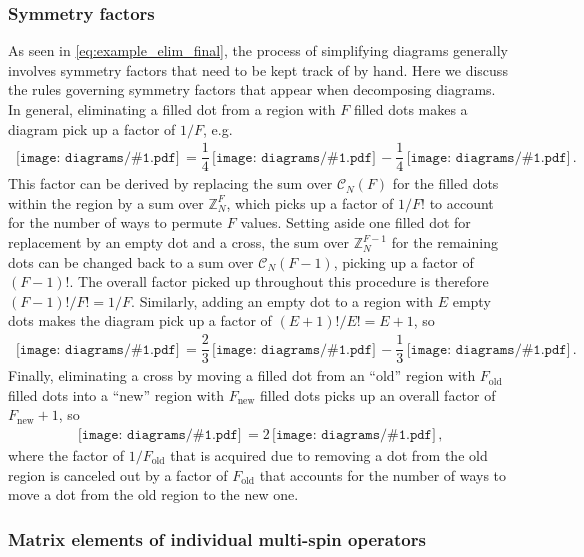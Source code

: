 \documentclass[nofootinbib,notitlepage,11pt]{revtex4-2}
\renewcommand{\t}{\text} %
\newcommand{\f}[2]{\dfrac{#1}{#2}} %
\newcommand{\p}[1]{\left(#1\right)} %
\newcommand{\1}{\mathds{1}}
\newcommand{\C}{\mathcal{C}}
\newcommand{\ZZ}{\mathbb{Z}}
\newcommand{\diagram}[1]
{\,\texttt{[image: diagrams/\#1.pdf]}\,}
\begin{document}
\subsubsection{Symmetry factors}

As seen in \eqref{eq:example_elim_final}, the process of simplifying
diagrams generally involves symmetry factors that need to be kept
track of by hand.  Here we discuss the rules governing symmetry
factors that appear when decomposing diagrams.  In general,
eliminating a filled dot from a region with $F$ filled dots makes a
diagram pick up a factor of $1/F$, e.g.
\begin{align}
  \diagram{example_sym}
  = \f14 \diagram{example_sym_o}
  - \f14 \diagram{example_sym_x}.
\end{align}
This factor can be derived by replacing the sum over $\C_N\p{F}$ for
the filled dots within the region by a sum over $\ZZ_N^{F}$, which
picks up a factor of $1/F!$ to account for the number of ways to
permute $F$ values.  Setting aside one filled dot for replacement by
an empty dot and a cross, the sum over $\ZZ_N^{F-1}$ for the remaining
dots can be changed back to a sum over $\C_N\p{F-1}$, picking up a
factor of $\p{F-1}!$.  The overall factor picked up throughout this
procedure is therefore $\p{F-1}!/F!=1/F$.  Similarly, adding an empty
dot to a region with $E$ empty dots makes the diagram pick up a factor
of $\p{E+1}!/E!=E+1$, so
\begin{align}
  \diagram{example_sym_o}
  = \f23 \diagram{example_sym_oo}
  - \f13 \diagram{example_sym_ox}.
\end{align}
Finally, eliminating a cross by moving a filled dot from an ``old''
region with $F_{\t{old}}$ filled dots into a ``new'' region with
$F_{\t{new}}$ filled dots picks up an overall factor of
$F_{\t{new}}+1$, so
\begin{align}
  \diagram{example_sym_x}
  = 2 \diagram{example_sym_x_elim},
\end{align}
where the factor of $1/F_{\t{old}}$ that is acquired due to removing a
dot from the old region is canceled out by a factor of $F_{\t{old}}$
that accounts for the number of ways to move a dot from the old region
to the new one.

\subsubsection{Matrix elements of individual multi-spin operators}
\end{document}
